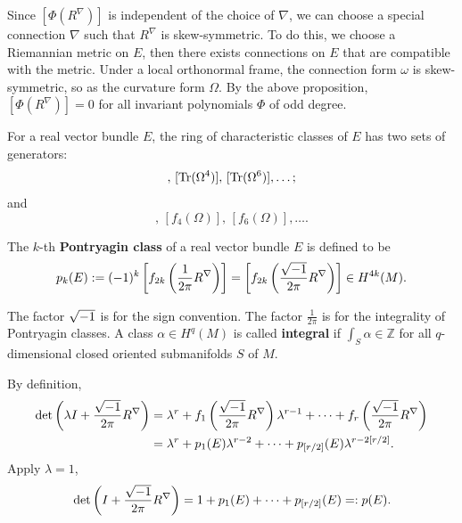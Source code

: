 Since $[\Phi(R^\nabla)]$ is independent of the choice of $\nabla$, 
we can choose a special connection $\nabla$ such that $R^\nabla$ is skew-symmetric. 
To do this, we choose a Riemannian metric on $E$, then there exists connections on $E$ that are compatible with the metric. 
Under a local orthonormal frame, the connection form $\omega$ is skew-symmetric, so as the curvature form $\Omega$. 
By the above proposition, $[\Phi(R^\nabla)] = 0$ for all invariant polynomials $\Phi$ of odd degree.
\begin{corollary}
    For a real vector bundle $E$, the ring of characteristic classes of $E$ has two sets of generators:
    \begin{equation*}
        [\Tr(\Omega^2)],\, [\Tr(\Omega^4)],\, [\Tr(\Omega^6)], \dots; 
    \end{equation*}
    and
    \begin{equation*}
        [f_2(\Omega)],\, [f_4(\Omega)],\, [f_6(\Omega)], \dots.
    \end{equation*}
\end{corollary}
\begin{definition}
    The $k$-th \textbf{Pontryagin class} of a real vector bundle $E$ is defined to be 
    \begin{equation*}
        p_k(E) := (-1)^k\left[f_{2k}\left(\frac{1}{2\pi}R^\nabla\right)\right] = \left[f_{2k}\left(\frac{\sqrt{-1}}{2\pi}R^\nabla\right)\right] \in H^{4k}(M).
    \end{equation*}
\end{definition}
\begin{remark}
    The factor $\sqrt{-1}$ is for the sign convention. The factor $\frac{1}{2\pi}$ is for the integrality of Pontryagin classes. 
    A class $\alpha\in H^{q}(M)$ is called \textbf{integral} 
    if $\int_S \alpha\in\mathbb{Z}$ for all $q$-dimensional closed oriented submanifolds $S$ of $M$.
\end{remark}
By definition, 
\begin{align*}
    \det\left(\lambda I + \frac{\sqrt{-1}}{2\pi}R^\nabla\right) 
    &= \lambda^r + f_1\left(\frac{\sqrt{-1}}{2\pi}R^\nabla\right)\lambda^{r-1} + \cdots + f_r\left(\frac{\sqrt{-1}}{2\pi}R^\nabla\right) \\
    &= \lambda^r + p_1(E)\lambda^{r-2} + \cdots + p_{[r/2]}(E)\lambda^{r-2[r/2]}.
\end{align*}
Apply $\lambda = 1$, 
\begin{equation*}
    \det\left(I + \frac{\sqrt{-1}}{2\pi}R^\nabla\right) = 1 + p_1(E) + \cdots + p_{[r/2]}(E) =: p(E).
\end{equation*} 
